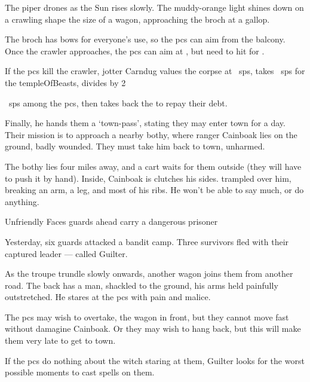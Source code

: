 \documentclass[10pt,twoside]{book}
\begin{document}
The piper drones as the Sun rises slowly.
The muddy-orange light shines down on a crawling shape the size of a wagon, approaching the \gls{broch} at a gallop.

The \gls{broch} has \glspl{bow} for everyone's use, so the \glspl{pc} can aim from the balcony.
Once the \gls{crawler} approaches, the \glspl{pc} can aim at \tn[12], but need to hit \tn[17] for .

If the \glspl{pc} kill the \gls{crawler}, \gls{jotter} Carndug values the corpse at ~\glspl{sp}, takes
~\glspl{sp} for the \gls{templeOfBeasts}, divides
\divide\value{gold} by 2%
\addtocounter{gold}{0}%
~\glspl{sp} among the \glspl{pc}, then takes back the  to repay their debt.

Finally, he hands them a `town-pass', stating they may enter town for a day.
Their mission is to approach a nearby \gls{bothy}, where \gls{ranger} Cainboak lies on the ground, badly wounded.
They must take him back to town, unharmed.

The \gls{bothy} lies four miles away, and a cart waits for them outside (they will have to push it by hand).
Inside, Cainboak is clutches his sides.
 trampled over him, breaking an arm, a leg, and most of his ribs.
He won't be able to say much, or do anything.

{Unfriendly Faces}%
{\Glspl{guard} ahead carry a dangerous prisoner}%

\begin{exampletext}
  Yesterday, six \glspl{guard} attacked a bandit camp.
  Three survivors fled with their captured leader ---  called Guilter.
\end{exampletext}

As the troupe trundle slowly onwards, another wagon joins them from another road.
The back has a man, shackled to the ground, his arms held painfully outstretched.
He stares at the \glspl{pc} with pain and malice.

The \glspl{pc} may wish to overtake, the wagon in front, but they cannot move fast without damagine Cainboak.
Or they may wish to hang back, but this will make them very late to get to town.


\showStdSpells

If the \glspl{pc} do nothing about the \gls{witch} staring at them, Guilter looks for the worst possible moments to cast spells on them.
\end{document}
